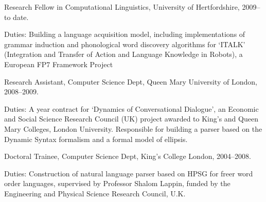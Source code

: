 \documentclass[a4paper]{article}
\renewenvironment{itemize}{
  \begin{list}{}{
    \setlength{\leftmargin}{1.5em}
  }
}{
  \end{list}
}
\begin{document}
\begin{itemize}
\item \hspace{-.2cm}Research Fellow in Computational Linguistics,
  University of Hertfordshire, 2009--to date. 

\hspace{-.2cm}Duties: Building a language acquisition model, including implementations of  grammar induction and phonological word discovery algorithms for `ITALK' (Integration and Transfer of Action and Language Knowledge in Robots), a European FP7 Framework Project  \\

\item \hspace{-.2cm}Research Assistant, Computer Science Dept, Queen
  Mary University of London, 2008--2009.

\hspace{-.2cm}Duties: A year contract for `Dynamics of Conversational
Dialogue', an Economic and Social Science Research Council (UK)
project awarded to King's and Queen Mary Colleges, London University. Responsible for building a parser based on the Dynamic Syntax formalism and a formal model of ellipsis.

\vspace{.4cm}

\item \hspace{-.2cm}Doctoral Trainee, Computer Science Dept, King's
  College London, 2004--2008.

\hspace{-.2cm}Duties: Construction of natural language parser based on
HPSG for freer word order languages, supervised by Professor Shalom
Lappin, funded by the Engineering and Physical Science Research Council, U.K. 
\end{itemize}
\end{document}
